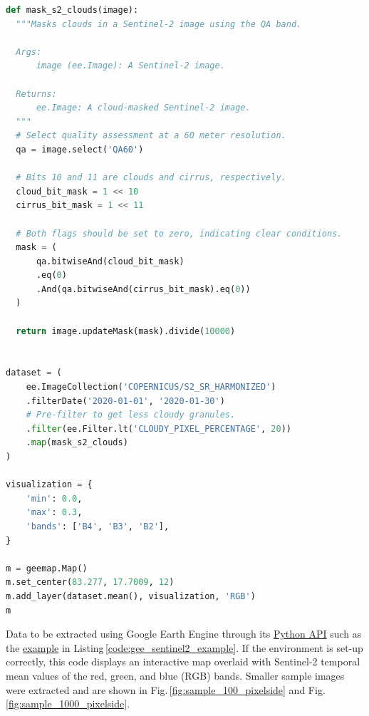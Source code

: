 \begin{lstlisting}[language=Python, caption={Python code example for extracting and visualising Sentinel-2 data.}, label={code:gee_sentinel2_example}]
def mask_s2_clouds(image):
  """Masks clouds in a Sentinel-2 image using the QA band.

  Args:
      image (ee.Image): A Sentinel-2 image.

  Returns:
      ee.Image: A cloud-masked Sentinel-2 image.
  """
  # Select quality assessment at a 60 meter resolution.
  qa = image.select('QA60')

  # Bits 10 and 11 are clouds and cirrus, respectively.
  cloud_bit_mask = 1 << 10
  cirrus_bit_mask = 1 << 11

  # Both flags should be set to zero, indicating clear conditions.
  mask = (
      qa.bitwiseAnd(cloud_bit_mask)
      .eq(0)
      .And(qa.bitwiseAnd(cirrus_bit_mask).eq(0))
  )

  return image.updateMask(mask).divide(10000)


dataset = (
    ee.ImageCollection('COPERNICUS/S2_SR_HARMONIZED')
    .filterDate('2020-01-01', '2020-01-30')
    # Pre-filter to get less cloudy granules.
    .filter(ee.Filter.lt('CLOUDY_PIXEL_PERCENTAGE', 20))
    .map(mask_s2_clouds)
)

visualization = {
    'min': 0.0,
    'max': 0.3,
    'bands': ['B4', 'B3', 'B2'],
}

m = geemap.Map()
m.set_center(83.277, 17.7009, 12)
m.add_layer(dataset.mean(), visualization, 'RGB')
m
\end{lstlisting}

Data to be extracted using Google Earth Engine through its \href{https://developers.google.com/earth-engine/apidocs}{Python API} such as the \href{https://developers.google.com/earth-engine/datasets/catalog/COPERNICUS_S2_SR_HARMONIZED#colab-python}{example} in Listing\,\ref{code:gee_sentinel2_example}. If the environment is set-up correctly, this code displays an interactive map overlaid with Sentinel-2 temporal mean values of the red, green, and blue (RGB) bands. Smaller sample images were extracted and are shown in Fig.\,\ref{fig:sample_100_pixelside} and Fig.\,\ref{fig:sample_1000_pixelside}.

